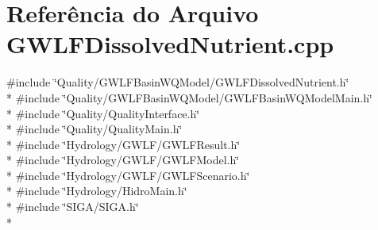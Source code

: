 \section{Referência do Arquivo G\+W\+L\+F\+Dissolved\+Nutrient.\+cpp}
\label{_g_w_l_f_dissolved_nutrient_8cpp}
{\ttfamily \#include \char`\"{}Quality/\+G\+W\+L\+F\+Basin\+W\+Q\+Model/\+G\+W\+L\+F\+Dissolved\+Nutrient.\+h\char`\"{}}\\*
{\ttfamily \#include \char`\"{}Quality/\+G\+W\+L\+F\+Basin\+W\+Q\+Model/\+G\+W\+L\+F\+Basin\+W\+Q\+Model\+Main.\+h\char`\"{}}\\*
{\ttfamily \#include \char`\"{}Quality/\+Quality\+Interface.\+h\char`\"{}}\\*
{\ttfamily \#include \char`\"{}Quality/\+Quality\+Main.\+h\char`\"{}}\\*
{\ttfamily \#include \char`\"{}Hydrology/\+G\+W\+L\+F/\+G\+W\+L\+F\+Result.\+h\char`\"{}}\\*
{\ttfamily \#include \char`\"{}Hydrology/\+G\+W\+L\+F/\+G\+W\+L\+F\+Model.\+h\char`\"{}}\\*
{\ttfamily \#include \char`\"{}Hydrology/\+G\+W\+L\+F/\+G\+W\+L\+F\+Scenario.\+h\char`\"{}}\\*
{\ttfamily \#include \char`\"{}Hydrology/\+Hidro\+Main.\+h\char`\"{}}\\*
{\ttfamily \#include \char`\"{}S\+I\+G\+A/\+S\+I\+G\+A.\+h\char`\"{}}\\*
